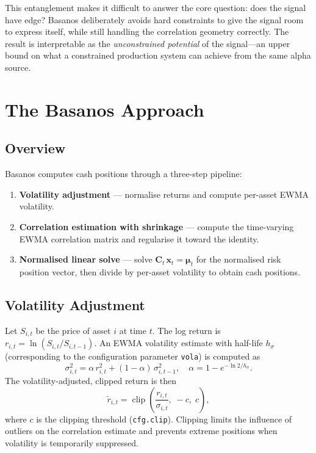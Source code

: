 \documentclass[11pt,a4paper]{article}
\newcommand{\C}{\mathbf{C}}
\newcommand{\x}{\mathbf{x}}
\newcommand{\muvec}{\bm{\mu}}
\begin{document}
This entanglement makes it difficult to answer the core question: does the
signal have edge?  Basanos deliberately avoids hard constraints to give the
signal room to express itself, while still handling the correlation geometry
correctly.  The result is interpretable as the \emph{unconstrained potential}
of the signal---an upper bound on what a constrained production system can
achieve from the same alpha source.

\section{The Basanos Approach}
\label{sec:approach}

\subsection{Overview}

Basanos computes cash positions through a three-step pipeline:

\begin{enumerate}
  \item \textbf{Volatility adjustment} --- normalise returns and compute
    per-asset EWMA volatility.
  \item \textbf{Correlation estimation with shrinkage} --- compute the
    time-varying EWMA correlation matrix and regularise it toward the
    identity.
  \item \textbf{Normalised linear solve} --- solve $\C_t\,\x_t = \muvec_t$
    for the normalised risk position vector, then divide by per-asset
    volatility to obtain cash positions.
\end{enumerate}

\subsection{Volatility Adjustment}
\label{sec:vola}

Let $S_{i,t}$ be the price of asset $i$ at time $t$.  The log return is
$r_{i,t} = \ln(S_{i,t}/S_{i,t-1})$.  An EWMA volatility estimate with
half-life $h_\sigma$ (corresponding to the configuration parameter
\texttt{vola}) is computed as
\begin{equation}
  \sigma_{i,t}^2 = \alpha\,r_{i,t}^2 + (1-\alpha)\,\sigma_{i,t-1}^2,
  \quad \alpha = 1 - e^{-\ln 2/h_\sigma}.
\end{equation}
The volatility-adjusted, clipped return is then
\begin{equation}
  \tilde{r}_{i,t} = \operatorname{clip}\!\left(\frac{r_{i,t}}{\sigma_{i,t}},\;
                    -c,\; c\right),
\end{equation}
where $c$ is the clipping threshold (\texttt{cfg.clip}).  Clipping limits
the influence of outliers on the correlation estimate and prevents extreme
positions when volatility is temporarily suppressed.
\end{document}
